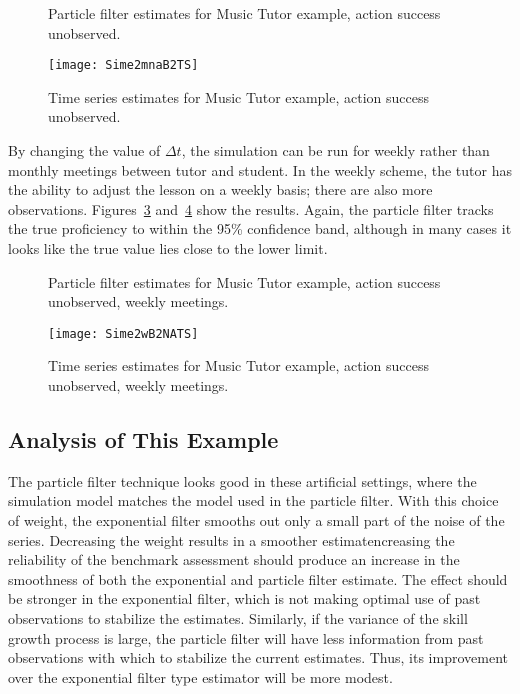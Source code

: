 \documentclass[12pt]{RR-article}
\begin{document}
\begin{figure}[ht]
\begin{centering}
\caption{Particle filter estimates for Music Tutor example, action
  success unobserved.}  
\label{fig:Sim2mna}
\end{centering}
\end{figure}

\begin{figure}[p]
\centerline{\texttt{[image: Sime2mnaB2TS]}}
\caption{Time series estimates for Music Tutor example, action success
unobserved.}
\label{fig:Sim2mnaTS}
\end{figure}

By changing the value of $\Delta t$, the simulation can be run for
weekly rather than monthly meetings between tutor and student.  In the
weekly scheme, the tutor has the ability to adjust the lesson on a
weekly basis; there are also more observations.
Figures~\ref{fig:Sim2wna}  and~\ref{fig:Sim2wnaTS} show the results.
Again, the particle filter tracks the true proficiency to within the
95\% confidence band, although in many cases it looks like the true
value lies close to the lower limit.

\begin{figure}[ht]
\begin{centering}
\caption{Particle filter estimates for Music Tutor example, action
  success unobserved, weekly meetings.}  
\label{fig:Sim2wna}
\end{centering}
\end{figure}

\begin{figure}[p]
\centerline{\texttt{[image: Sime2wB2NATS]}}
\caption{Time series estimates for Music Tutor example, action success
unobserved, weekly meetings.}
\label{fig:Sim2wnaTS}
\end{figure}

\subsection{Analysis of This Example}
\label{subs:analysis}

The particle filter technique looks good in these artificial
settings, where the simulation model matches the model used in the
particle filter.  With this choice of weight, the exponential filter
smooths out only a small part of the noise of the series.  Decreasing
the weight results in a smoother estimatencreasing the reliability of the benchmark assessment should
produce an increase in the smoothness of both the exponential and 
particle filter estimate.  The effect should be stronger in the
exponential filter, which is not making optimal use of past
observations to stabilize the estimates.  Similarly, if the variance
of the skill growth process is large, the particle filter will have
less information from past observations with which to stabilize the
current estimates.  Thus, its improvement over the exponential filter
type estimator will be more modest.
\end{document}
